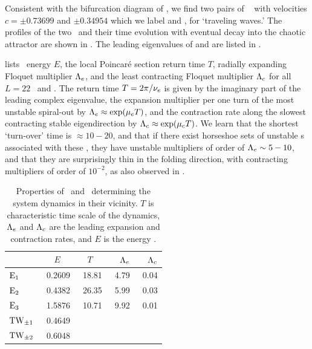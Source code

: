 Consistent with the bifurcation diagram of ,
we find two pairs of \reqva\  with velocities
$c =\pm 0.73699$ and $\pm 0.34954$
which we label  and ,
for `traveling waves.'
The profiles of the two \reqva\ and their time evolution
with eventual decay into the chaotic attractor are
shown in .  The leading eigenvalues of
 and  are listed in .

 lists \eqv\ energy $E$,
the local Poincar\'e section return time $T$,
radially expanding Floquet multiplier $\ExpaEig_e$, and
the least contracting Floquet multiplier $\ExpaEig_c$
for all $L=22$ \eqva\ and \reqva.
The return time $T=2\pi/\eigIm[e]$ is given by the imaginary
part of the leading complex eigenvalue,
the expansion
multiplier per one turn of the most unstable spiral-out by
$\ExpaEig_e\approx\exp(\eigRe[e] T)$, and the contraction
rate along the slowest contracting stable eigendirection by
$\ExpaEig_c\approx\exp(\eigRe[c]T)$. We learn that the shortest
`turn-over' time is $\approx 10-20$, and that if there exist
horseshoe sets of unstable \po s associated with
these \eqva,  they have unstable
multipliers of order of $\ExpaEig_e \sim 5-10$, and that
they are surprisingly thin in the folding direction, with
contracting multipliers of order of $10^{-2}$,
as also observed in .

\begin{table}[ht]
    \caption{
    Properties of \eqva\ and \reqva\ determining
    the system dynamics in their vicinity.  $T$ is characteristic
    time scale of the dynamics, $\ExpaEig_e$ and $\ExpaEig_c$ are the
    leading expansion and contraction rates, and $E$ is the
    energy .
            }
\begin{center} \footnotesize
    \begin{tabular}{l|rrrr}
                 & $E$~~   & $T$~~  & $\ExpaEig_e$  & $\ExpaEig_c$  \\ \hline
 $\EQV{1}\ $     &\ 0.2609 &\ 18.81 &\ 4.79     &\ 0.04 \\
 $\EQV{2}\ $     &\ 0.4382 &\ 26.35 &\ 5.99     &\ 0.03 \\
 $\EQV{3}\ $     &\ 1.5876 &\ 10.71 &\ 9.92     &\ 0.01 \\
 $\REQV{\pm}{1}$ &\ 0.4649 &  &  & \\
 $\REQV{\pm}{2}$ &\ 0.6048 &  &  & \\
    \end{tabular}
\end{center}
\label{tab:L22cminus}
\end{table}

